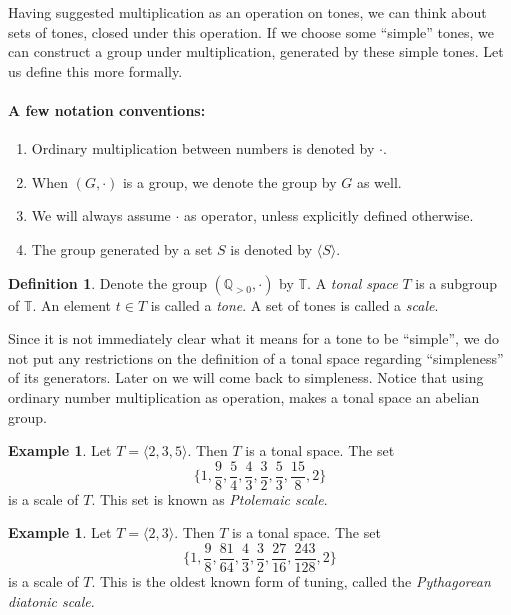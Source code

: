 \documentclass[a4paper]{book}
\theoremstyle{definition}
\newtheorem{definition}[theorem]{Definition}
\newtheorem{example}[theorem]{Example}
\begin{document}
Having suggested multiplication as an operation on tones, we can think about sets of tones, closed under this operation.
If we choose some ``simple'' tones, we can construct a group under multiplication, generated by these simple tones.
Let us define this more formally.

\newcommand{\gen}[1]{\langle #1 \rangle}

\paragraph{A few notation conventions:}
\begin{enumerate}[i]
	\item 
		Ordinary multiplication between numbers is denoted by $\cdot$.
	\item 
		When $(G, \cdot)$ is a group, we denote the group by $G$ as well.
    \item
        We will always assume $\cdot$ as operator, unless explicitly defined otherwise.
    \item
        The group generated by a set $S$ is denoted by $\gen{S}$.
\end{enumerate}

\newcommand{\Q}{\mathbb{T}}%
\newcommand{\R}{\mathbb{R}_{> 0}}
\newcommand{\T}{\mathbb{T}}

\begin{definition}
    Denote the group $(\mathbb{Q}_{> 0}, \cdot)$ by $\Q$.
	A \emph{tonal space} $T$ is a subgroup of $\Q$.
    An element $t \in T$ is called a \emph{tone}.
    A set of tones is called a \emph{scale}.
\end{definition}

Since it is not immediately clear what it means for a tone to be ``simple'', we do not put any restrictions on the definition of a tonal space regarding ``simpleness'' of its generators.
Later on we will come back to simpleness.
Notice that using ordinary number multiplication as operation, makes a tonal space an abelian group.

\begin{example}
    \label{ptolemaic_sequence}
    Let $T = \gen{2,3,5}$.
    Then $T$ is a tonal space.
    The set \[\{1,\frac{9}{8},\frac{5}{4},\frac{4}{3},\frac{3}{2},\frac{5}{3},\frac{15}{8},2\}\] is a scale of $T$.
    This set is known as \emph{Ptolemaic scale}.
\end{example}

\begin{example}
    Let $T = \gen{2,3}$.
    Then $T$ is a tonal space.
    The set \[\{1,\frac{9}{8},\frac{81}{64},\frac{4}{3},\frac{3}{2},\frac{27}{16},\frac{243}{128},2\}\] is a scale of $T$.
    This is the oldest known form of tuning, called the \emph{Pythagorean diatonic scale}.
\end{example}
\end{document}
